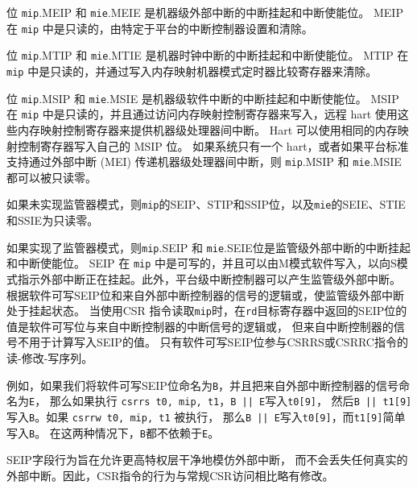 位 {\tt mip}.MEIP 和 {\tt mie}.MEIE 是机器级外部中断的中断挂起和中断使能位。 
MEIP 在 {\tt mip} 中是只读的，由特定于平台的中断控制器设置和清除。

位 {\tt mip}.MTIP 和 {\tt mie}.MTIE 是机器时钟中断的中断挂起和中断使能位。
MTIP 在 {\tt mip} 中是只读的，并通过写入内存映射机器模式定时器比较寄存器来清除。

位 {\tt mip}.MSIP 和 {\tt mie}.MSIE 是机器级软件中断的中断挂起和中断使能位。 
MSIP 在 {\tt mip} 中是只读的，并且通过访问内存映射控制寄存器来写入，远程 hart 使用这些内存映射控制寄存器来提供机器级处理器间中断。
Hart 可以使用相同的内存映射控制寄存器写入自己的 MSIP 位。 
如果系统只有一个 hart，或者如果平台标准支持通过外部中断 (MEI) 传递机器级处理器间中断，则 {\tt mip}.MSIP 和 {\tt mie}.MSIE 都可以被只读零。

如果未实现监管器模式，则{\tt mip}的SEIP、STIP和SSIP位，以及{\tt mie}的SEIE、STIE和SSIE为只读零。

如果实现了监管器模式，则{\tt mip}.SEIP 和 {\tt mie}.SEIE位是监管级外部中断的中断挂起和中断使能位。
SEIP 在 {\tt mip} 中是可写的，并且可以由M模式软件写入，以向S模式指示外部中断正在挂起。此外，平台级中断控制器可以产生监管级外部中断。
根据软件可写SEIP位和来自外部中断控制器的信号的逻辑或，使监管级外部中断处于挂起状态。
当使用CSR 指令读取{\tt mip}时，在{\tt rd}目标寄存器中返回的SEIP位的值是软件可写位与来自中断控制器的中断信号的逻辑或，
但来自中断控制器的信号不用于计算写入SEIP的值。
只有软件可写SEIP位参与CSRRS或CSRRC指令的读-修改-写序列。

\iffalse
\begin{commentary}
  For example, if we name the software-writable SEIP bit {\tt B} and the
  signal from the external interrupt controller {\tt E}, then if \mbox{\tt csrrs
  t0, mip, t1} is executed, {\tt t0[9]} is written with \mbox{\tt B || E}, then
  {\tt B} is written with \mbox{\tt B || t1[9]}.
  If \mbox{\tt csrrw t0, mip, t1} is executed, then {\tt t0[9]} is written with
  \mbox{\tt B || E}, and {\tt B} is simply written with {\tt t1[9]}.
  In neither case does {\tt B} depend upon {\tt E}.

  The SEIP field behavior is designed to allow a higher privilege
  layer to mimic external interrupts cleanly, without losing any real
  external interrupts.  The behavior of the CSR instructions is
  slightly modified from regular CSR accesses as a result.
\end{commentary}
\fi

\begin{commentary}
  例如，如果我们将软件可写SEIP位命名为{\tt B}，并且把来自外部中断控制器的信号命名为{\tt E}，
  那么如果执行 \mbox{\tt csrrs t0, mip, t1}，\mbox{\tt B || E}写入{\tt t0[9]}，
  然后\mbox{\tt B || t1[9]}写入{\tt B}。如果 \mbox{\tt csrrw t0, mip, t1} 被执行，
  那么\mbox{\tt B || E}写入{\tt t0[9]}，而{\tt t1[9]}简单写入{\tt B}。 
  在这两种情况下，{\tt B}都不依赖于{\tt E}。 
  
  SEIP字段行为旨在允许更高特权层干净地模仿外部中断，
  而不会丢失任何真实的外部中断。因此，CSR指令的行为与常规CSR访问相比略有修改。
\end{commentary}

